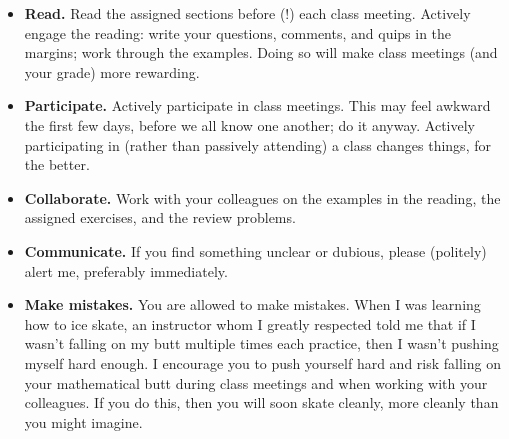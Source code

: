 \begin{itemize}
\item \textbf{Read.} Read the assigned sections before (!) each class meeting. Actively engage the reading: write your questions, comments, and quips in the margins; work through the examples. Doing so will make class meetings (and your grade) more rewarding.
\item \textbf{Participate.} Actively participate in class meetings. This may feel awkward the first few days, before we all know one another; do it anyway. Actively participating in (rather than passively attending) a class changes things, for the better.
\item \textbf{Collaborate.} Work with your colleagues on the examples in the reading, the assigned exercises, and the review problems.
\item \textbf{Communicate.} If you find something unclear or dubious, please (politely) alert me, preferably immediately.
\item \textbf{Make mistakes.} You are allowed to make mistakes. When I was learning how to ice skate, an instructor whom I greatly respected told me that if I wasn't falling on my butt multiple times each practice, then I wasn't pushing myself hard enough. I encourage you to push yourself hard and risk falling on your mathematical butt during class meetings and when working with your colleagues. If you do this, then you will soon skate cleanly, more cleanly than you might imagine.
\end{itemize}